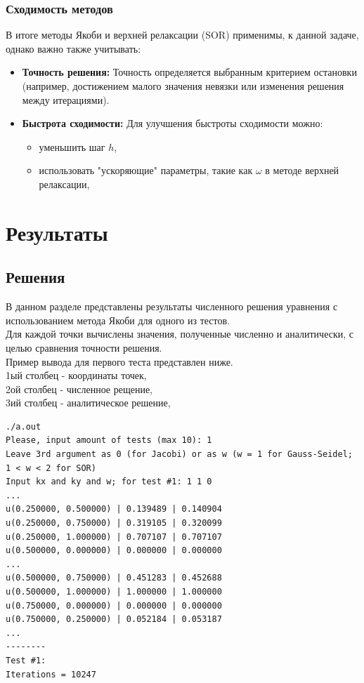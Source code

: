 \documentclass[a4paper, fleqn]{report}
\begin{document}
\subsection*{Сходимость методов}
В итоге методы Якоби и верхней релаксации (SOR) применимы, к данной задаче, однако важно также учитывать:
\begin{itemize}
    \item \textbf{Точность решения:} Точность определяется выбранным критерием остановки (например, достижением малого значения невязки или изменения решения между итерациями).
    \item \textbf{Быстрота сходимости:} Для улучшения быстроты сходимости можно:
    \begin{itemize}
        \item уменьшить шаг $h$,
        \item использовать "ускоряющие" параметры, такие как $\omega$ в методе верхней релаксации,
    \end{itemize}
\end{itemize}
\newpage


\chapter{Результаты}

\section*{Решения}
В данном разделе представлены результаты численного решения уравнения с использованием метода Якоби для одного из тестов. \\
Для каждой точки вычислены значения, полученные численно и аналитически, с целью сравнения точности решения. \\
Пример вывода для первого теста представлен ниже. \\
1ый столбец - координаты точек, \\
2ой столбец - численное рещение, \\
3ий столбец - аналитическое решение, \\

\lstset{language=bash}
\begin{lstlisting}[title={Вывод метода Якоби для 1го теста (для некоторых точек, покоординатно кратных 0.25)}]
./a.out
Please, input amount of tests (max 10): 1
Leave 3rd argument as 0 (for Jacobi) or as w (w = 1 for Gauss-Seidel; 1 < w < 2 for SOR)
Input kx and ky and w; for test #1: 1 1 0
...
u(0.250000, 0.500000) | 0.139489 | 0.140904
u(0.250000, 0.750000) | 0.319105 | 0.320099
u(0.250000, 1.000000) | 0.707107 | 0.707107
u(0.500000, 0.000000) | 0.000000 | 0.000000
...
u(0.500000, 0.750000) | 0.451283 | 0.452688
u(0.500000, 1.000000) | 1.000000 | 1.000000
u(0.750000, 0.000000) | 0.000000 | 0.000000
u(0.750000, 0.250000) | 0.052184 | 0.053187
...
--------
Test #1:
Iterations = 10247
\end{lstlisting} 
\vspace{0.25cm}
\end{document}
